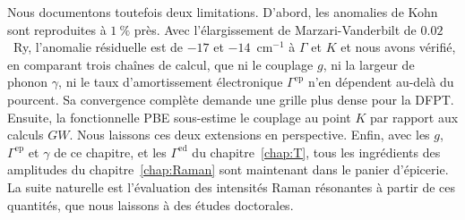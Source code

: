 Nous documentons toutefois deux limitations. D'abord, les anomalies de Kohn sont reproduites à $1~\%$ près. Avec l'élargissement de Marzari-Vanderbilt de $0.02$~Ry, l'anomalie résiduelle est de $-17$ et $-14$~cm$^{-1}$ à $\Gamma$ et $K$ et nous avons vérifié, en comparant trois chaînes de calcul, que ni le couplage $g$, ni la largeur de phonon $\gamma$, ni le taux d'amortissement électronique $\Gamma^\text{ep}$ n'en dépendent au-delà du pourcent. Sa convergence complète demande une grille plus dense pour la DFPT. Ensuite, la fonctionnelle PBE sous-estime le couplage au point $K$ par rapport aux calculs $GW$. Nous laissons ces deux extensions en perspective. Enfin, avec les $g$, $\Gamma^\text{ep}$ et $\gamma$ de ce chapitre, et les $\Gamma^\text{ed}$ du chapitre~\ref{chap:T}, tous les ingrédients des amplitudes du chapitre~\ref{chap:Raman} sont maintenant dans le panier d'épicerie. La suite naturelle est l'évaluation des intensités Raman résonantes à partir de ces quantités, que nous laissons à des études doctorales.